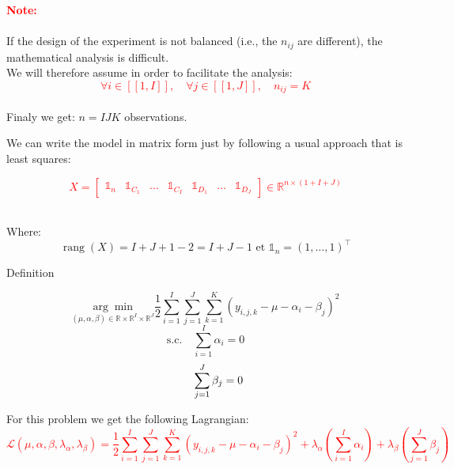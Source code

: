 \documentclass{beamer}
\begin{document}
\begin{frame}{}

 
\textcolor{red}{\textbf{Note:}} \\
\\
\vspace{0.5cm}If the design of the experiment is not balanced (i.e., the $n_{i j}$ are different), the mathematical analysis is difficult.\\
\vspace{0.3cm}
We will therefore assume in order to facilitate the analysis:
\textcolor{red}{$$\forall i \in[\![1, I]\!], \quad \forall j \in[\![1, J]\!], \quad n_{i j}=K $$}\\

Finaly we get: $n=IJK$ observations.
\end{frame}


\begin{frame}{}   
We can write the model in matrix form just by  following a usual approach that is least squares:\\

\begin{alertblock}{}
\vspace{1cm}
\textcolor{red}{$$X=\left[\begin{array}{lllllll}
\mathbb{1}_{n} & \mathbb{1}_{C_{1}} & \ldots & \mathbb{1}_{C_{I}} & \mathbb{1}_{D_{1}} & \ldots & \mathbb{1}_{D_{J}}
\end{array}\right] \in \mathbb{R}^{n \times(1+I+J)}$$}
\end{alertblock}\\
Where:\\
$$\operatorname{rang}(X)=I+J+1-2=I+J-1 \text { et } \mathbb{1}_{n}=(1, \ldots, 1)^{\top}$$

\end{frame}








\begin{frame}{Definition}
\begin{alertblock}{}
$$\underset{(\mu, \alpha, \beta) \in \mathbb{R} \times \mathbb{R}^{I} \times \mathbb{R}^{J}}{\arg \min } \frac{1}{2} \sum_{i=1}^{I} \sum_{j=1}^{J} \sum_{k=1}^{K}\left(y_{i, j, k}-\mu-\alpha_{i}-\beta_{j}\right)^{2}$$
$$\text {s.c.} \quad \sum_{i=1}^{I} \alpha_{i}=0$$
 $$\hspace{0.83cm} \sum_{j=1}^{J} \beta_{j}=0$$
\end{alertblock}
\end{frame}








\begin{frame}{}
For this problem we get the following Lagrangian:
\vspace{1cm}
\textcolor{red}{$$\mathcal{L}\left(\mu, \alpha, \beta, \lambda_{\alpha}, \lambda_{\beta}\right)=\frac{1}{2} \sum_{i=1}^{I} \sum_{j=1}^{J} \sum_{k=1}^{K}\left(y_{i, j, k}-\mu-\alpha_{i}-\beta_{j}\right)^{2}+\lambda_{\alpha}\left(\sum_{i=1}^{I} \alpha_{i}\right)+\lambda_{\beta}\left(\sum_{j=1}^{J} \beta_{j}\right)$$}

\end{frame}
\end{document}
